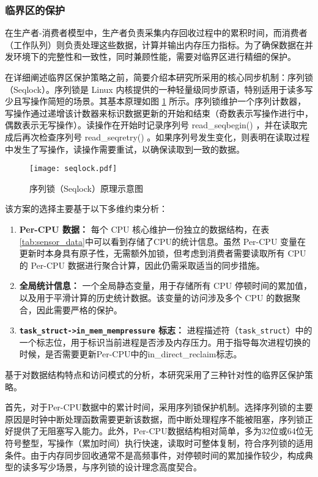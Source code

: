 \subsubsection{临界区的保护}

在生产者-消费者模型中，生产者负责采集内存回收过程中的累积时间，而消费者（工作队列）则负责处理这些数据，计算并输出内存压力指标。为了确保数据在并发环境下的完整性和一致性，同时兼顾性能，需要对临界区进行精细的保护。

在详细阐述临界区保护策略之前，简要介绍本研究所采用的核心同步机制：序列锁（Seqlock）。序列锁是 Linux 内核提供的一种轻量级同步原语，特别适用于读多写少且写操作简短的场景。其基本原理如图 \ref{fig:seqlock} 所示。序列锁维护一个序列计数器，写操作通过递增该计数器来标识数据更新的开始和结束（奇数表示写操作进行中，偶数表示无写操作）。读操作在开始时记录序列号 read\_seqbegin() ，并在读取完成后再次检查序列号 read\_seqretry() 。如果序列号发生变化，则表明在读取过程中发生了写操作，读操作需要重试，以确保读取到一致的数据。

\begin{figure}[H]
    \centering
    \texttt{[image: seqlock.pdf]}
    \caption{序列锁（Seqlock）原理示意图}
    \label{fig:seqlock}
\end{figure}

该方案的选择主要基于以下多维约束分析：

\begin{enumerate}
    \item \textbf{Per-CPU 数据：} 每个 CPU 核心维护一份独立的数据结构，在表\ref{tab:sensor_data}中可以看到存储了CPU的统计信息。虽然 Per-CPU 变量在更新时本身具有原子性，无需额外加锁，但考虑到消费者需要读取所有 CPU 的 Per-CPU 数据进行聚合计算，因此仍需采取适当的同步措施。

    \item \textbf{全局统计信息：} 一个全局静态变量，用于存储所有 CPU 停顿时间的累加值，以及用于平滑计算的历史统计数据。该变量的访问涉及多个 CPU 的数据聚合，因此需要严格的保护。

    \item \textbf{\texttt{task\_struct->in\_mem\_mempressure} 标志：} 进程描述符（\texttt{task\_struct}）中的一个标志位，用于标识当前进程是否涉及内存压力。用于指导每次进程切换的时候，是否需要更新Per-CPU中的in\_direct\_reclaim标志。
\end{enumerate}



基于对数据结构特点和访问模式的分析，本研究采用了三种针对性的临界区保护策略。

首先，对于Per-CPU数据中的累计时间，采用序列锁保护机制。选择序列锁的主要原因是时钟中断处理函数需要更新该数据，而中断处理程序不能被阻塞，序列锁正好提供了无阻塞写入能力。此外，Per-CPU数据结构相对简单，多为32位或64位无符号整型，写操作（累加时间）执行快速，读取时可整体复制，符合序列锁的适用条件。由于内存同步回收通常不是高频事件，对停顿时间的累加操作较少，构成典型的读多写少场景，与序列锁的设计理念高度契合。

